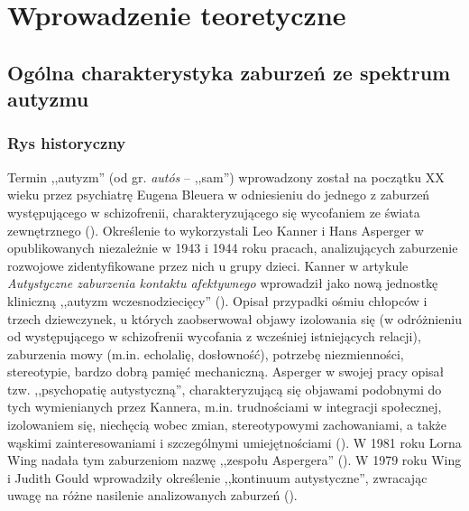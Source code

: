 \chapter{Wprowadzenie teoretyczne}
\thispagestyle{firststyle}

\section{Ogólna charakterystyka zaburzeń ze spektrum autyzmu}

    \subsection{Rys historyczny}
    Termin ,,autyzm'' (od gr. \emph{autós} -- ,,sam'') wprowadzony został na początku XX wieku przez psychiatrę Eugena Bleuera w odniesieniu do jednego z zaburzeń występującego w schizofrenii, charakteryzującego się wycofaniem ze świata zewnętrznego (\cite{frith2008autyzm}).
    Określenie to wykorzystali Leo Kanner i Hans Asperger w opublikowanych niezależnie w 1943 i 1944 roku pracach, analizujących zaburzenie rozwojowe zidentyfikowane przez nich u grupy dzieci.
    Kanner w artykule \emph{Autystyczne zaburzenia kontaktu afektywnego} wprowadził jako nową jednostkę kliniczną ,,autyzm wczesnodziecięcy'' (\cite{kanner1943autistic}).
    Opisał przypadki ośmiu chłopców i trzech dziewczynek, u których zaobserwował objawy izolowania się (w odróżnieniu od występującego w schizofrenii wycofania z wcześniej istniejących relacji), zaburzenia mowy (m.in. echolalię, dosłowność), potrzebę niezmienności, stereotypie, bardzo dobrą pamięć mechaniczną.
    Asperger w swojej pracy opisał tzw. ,,psychopatię autystyczną'', charakteryzującą się objawami podobnymi do tych wymienianych przez Kannera, m.in. trudnościami w integracji społecznej, izolowaniem się, niechęcią wobec zmian, stereotypowymi zachowaniami, a także wąskimi zainteresowaniami i szczególnymi umiejętnościami (\cite{asperger1991autistic}).
    W 1981 roku Lorna Wing nadała tym zaburzeniom nazwę ,,zespołu Aspergera'' (\cite{wing1981asperger}).
    W 1979 roku Wing i Judith Gould wprowadziły określenie ,,kontinuum autystyczne'', zwracając uwagę na różne nasilenie analizowanych zaburzeń (\cite{wing1979severe}).
    
